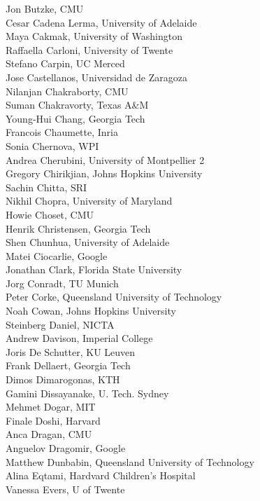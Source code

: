 \begin{multicols}{3}
{Jon Butzke, CMU\\
Cesar Cadena Lerma, University of Adelaide\\
Maya Cakmak, University of Washington\\
Raffaella Carloni, University of Twente\\
Stefano Carpin, UC Merced\\
Jose Castellanos, Universidad de Zaragoza\\
Nilanjan Chakraborty, CMU\\
Suman Chakravorty, Texas A\&M\\
Young-Hui Chang, Georgia Tech\\
Francois Chaumette, Inria\\
Sonia Chernova, WPI\\
Andrea Cherubini, University of Montpellier 2\\
Gregory Chirikjian, Johns Hopkins University\\
Sachin Chitta, SRI\\
Nikhil Chopra, University of Maryland\\
Howie Choset, CMU\\
Henrik Christensen, Georgia Tech\\
Shen Chunhua, University of Adelaide\\
Matei Ciocarlie, Google\\
Jonathan Clark, Florida State University\\
Jorg Conradt, TU Munich\\
Peter Corke, Queensland University of Technology\\
Noah Cowan, Johns Hopkins University\\
Steinberg Daniel, NICTA\\
Andrew Davison, Imperial College\\
Joris De Schutter, KU Leuven\\
Frank Dellaert, Georgia Tech\\
Dimos Dimarogonas, KTH\\
Gamini Dissayanake, U. Tech. Sydney\\
Mehmet Dogar, MIT\\
Finale Doshi, Harvard\\
Anca Dragan, CMU\\
Anguelov Dragomir, Google\\
Matthew Dunbabin, Queensland University of Technology\\
Alina Eqtami, Hardvard Children's Hospital\\
Vanessa Evers, U of Twente\\
}
\end{multicols}
